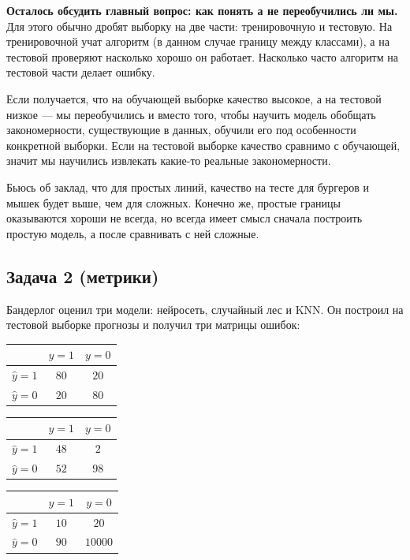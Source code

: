 \documentclass[12pt, a4paper, oneside]{article}
\begin{document}
{	\textbf{Осталось обсудить главный вопрос: как понять а не переобучились ли мы.}  Для этого обычно дробят выборку на две части: тренировочную и тестовую. На тренировочной учат алгоритм (в данном случае границу между классами), а на тестовой проверяют насколько хорошо он работает. Насколько часто алгоритм на тестовой части делает ошибку. 
	
	Если получается, что на обучающей выборке качество высокое, а на тестовой низкое --- мы переобучились и вместо того, чтобы научить модель обобщать закономерности, существующие в данных, обучили его под особенности конкретной выборки.  Если на тестовой выборке качество сравнимо с обучающей, значит мы научились извлекать какие-то реальные закономерности.
	
	Бьюсь об заклад, что для простых линий, качество на тесте для бургеров и мышек будет выше, чем для сложных.  Конечно же, простые границы оказываются хороши не всегда, но всегда имеет смысл сначала построить простую модель, а после сравнивать с ней сложные. 
}


\subsection*{Задача 2 (метрики)}

Бандерлог оценил три модели: нейросеть, случайный лес и KNN.  Он построил на тестовой выборке прогнозы и получил три матрицы ошибок: 

\begin{minipage}[t]{0.33\textwidth}
	\begin{tabular}{|c|c|c|}
		\hline
		& $y=1$  &  $ y = 0$ \\  \hline 
		$\hat y = 1$  &   $80$ &    $20$ \\      \hline 
		$\hat y = 0$ &   $20$ &     $80$ \\      \hline 
	\end{tabular}
\end{minipage}
\begin{minipage}[t]{0.33\textwidth}
	\begin{tabular}{|c|c|c|}
		\hline
		& $y=1$  &  $ y = 0$ \\  \hline 
		$\hat y = 1$  &   $48$ &    $2$ \\      \hline 
		$\hat y = 0$ &   $52$ &     $98$ \\      \hline 
	\end{tabular}
\end{minipage}
\begin{minipage}[t]{0.33\textwidth}
	\begin{tabular}{|c|c|c|}
		\hline
		& $y=1$  &  $ y = 0$ \\  \hline 
		$\hat y = 1$  &   $10$ &    $20$ \\         \hline 
		$\hat y = 0$ &   $90$ &    $10000$ \\   \hline 
	\end{tabular}
\end{minipage}
\end{document}
